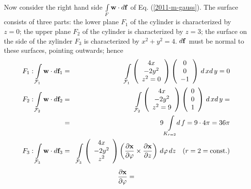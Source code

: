 {\begin{enumerate}
Now consider the right hand side $\int \limits_F {\bf w} \cdot d{\bf f}$
of Eq. (\ref{2011-m-gauss}).
The surface consists of three  parts:
the lower plane $F_1$ of the cylinder is characterized by $z=0$;
the upper plane $F_2$  of the cylinder is characterized by  $z=3$;
the surface on the side of the zylinder $F_3$
 is characterized by   $x^2+y^2=4$.
$d {\bf f}$ must be normal to these surfaces, pointing outwards; hence
 \begin{eqnarray*}
  F_1 : \int \limits_{{\cal F}_1} {\bf w} \cdot d{\bf f}_1  & = &
    \int \limits_{{\cal F}_1}
    \left(
      \begin{array}{c}
        4x \\
        -2y^2 \\
        z^2=0
      \end{array}
    \right)
    \left(
      \begin{array}{c}
        0 \\
        0 \\
        -1
      \end{array}
    \right)
    \, d\, x d\, y = 0 \\
  F_2 : \int \limits_{{\cal F}_2} {\bf w} \cdot d{\bf f}_2 & = &
    \int \limits_{{\cal F}_2}
    \left(
      \begin{array}{c}
        4x \\
        -2y^2 \\
        z^2=9
      \end{array}
    \right)
    \left(
      \begin{array}{c}
        0 \\
        0 \\
        1
      \end{array}
    \right)
    \, d\, x d\, y = \\
  & = & 9 \int \limits_{K_{r=2}} \!\! d\, f=9 \cdot 4 \pi=36 \pi \\
  F_3 : \int \limits_{{\cal F}_3} {\bf w} \cdot d{\bf f}_3 & = &
    \int \limits_{{\cal F}_3}
    \left(
      \begin{array}{c}
        4x \\
        -2y^2 \\
        z^2
      \end{array}
    \right)
    \left(
      \frac{\partial {\bf x}}{\partial \varphi} \times
      \frac{\partial {\bf x}}{\partial z}
    \right)
    \, d\varphi \, dz \quad (r=2=\mbox{const.})
\end{eqnarray*}
$$
  \frac{\partial {\bf x}}{\partial \varphi} =
$$
\end{enumerate}}
